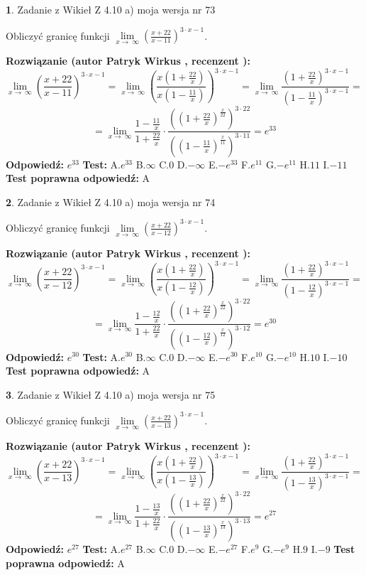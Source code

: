 \documentclass[12pt, a4paper]{article}
\theoremstyle{definition} %
\newtheorem{zad}{}
\newcommand{\zadStart}[1]{\begin{zad}#1\newline}
\newcommand{\zadStop}{\end{zad}}
\newcommand{\rozwStart}[2]{\noindent \textbf{Rozwiązanie (autor #1 , recenzent #2): }\newline}
\newcommand{\rozwStop}{\newline}
\newcommand{\odpStart}{\noindent \textbf{Odpowiedź:}\newline}
\newcommand{\odpStop}{\newline}
\newcommand{\testStart}{\noindent \textbf{Test:}\newline}
\newcommand{\testStop}{\newline}
\newcommand{\kluczStart}{\noindent \textbf{Test poprawna odpowiedź:}\newline}
\newcommand{\kluczStop}{\newline}
\begin{document}
\zadStart{Zadanie z Wikieł Z 4.10 a) moja wersja nr 73}

Obliczyć granicę funkcji  $\lim\limits_{x\to\ \infty}(\frac{x+22}{x-11})^{3\cdot x-1}$.
\zadStop
\rozwStart{Patryk Wirkus}{}
$$\lim\limits_{x\to\ \infty}(\frac{x+22}{x-11})^{3\cdot x-1} = \lim\limits_{x\to\ \infty}(\frac{x(1+\frac{22}{x})}{x(1-\frac{11}{x})})^{3\cdot x-1}=\lim\limits_{x\to\ \infty}\frac{(1+\frac{22}{x})^{3\cdot x-1}}{(1-\frac{11}{x})^{3\cdot x-1}}=$$
$$=\lim\limits_{x\to\ \infty}\frac{1-\frac{11}{x}}{1+\frac{22}{x}}\cdot\frac{((1+\frac{22}{x})^{\frac{x}{22}})^{3\cdot22}}{((1-\frac{11}{x})^{\frac{x}{11}})^{3\cdot11}}=e^{33}$$
\rozwStop
\odpStart
$e^{33}$
\odpStop
\testStart
A.$e^{33}$ B.$\infty$ C.$0$ D.$-\infty$ E.$-e^{33}$
F.$e^{11}$ G.$-e^{11}$
H.$11$
I.$-11$
\testStop
\kluczStart
A
\kluczStop



\zadStart{Zadanie z Wikieł Z 4.10 a) moja wersja nr 74}

Obliczyć granicę funkcji  $\lim\limits_{x\to\ \infty}(\frac{x+22}{x-12})^{3\cdot x-1}$.
\zadStop
\rozwStart{Patryk Wirkus}{}
$$\lim\limits_{x\to\ \infty}(\frac{x+22}{x-12})^{3\cdot x-1} = \lim\limits_{x\to\ \infty}(\frac{x(1+\frac{22}{x})}{x(1-\frac{12}{x})})^{3\cdot x-1}=\lim\limits_{x\to\ \infty}\frac{(1+\frac{22}{x})^{3\cdot x-1}}{(1-\frac{12}{x})^{3\cdot x-1}}=$$
$$=\lim\limits_{x\to\ \infty}\frac{1-\frac{12}{x}}{1+\frac{22}{x}}\cdot\frac{((1+\frac{22}{x})^{\frac{x}{22}})^{3\cdot22}}{((1-\frac{12}{x})^{\frac{x}{12}})^{3\cdot12}}=e^{30}$$
\rozwStop
\odpStart
$e^{30}$
\odpStop
\testStart
A.$e^{30}$ B.$\infty$ C.$0$ D.$-\infty$ E.$-e^{30}$
F.$e^{10}$ G.$-e^{10}$
H.$10$
I.$-10$
\testStop
\kluczStart
A
\kluczStop



\zadStart{Zadanie z Wikieł Z 4.10 a) moja wersja nr 75}

Obliczyć granicę funkcji  $\lim\limits_{x\to\ \infty}(\frac{x+22}{x-13})^{3\cdot x-1}$.
\zadStop
\rozwStart{Patryk Wirkus}{}
$$\lim\limits_{x\to\ \infty}(\frac{x+22}{x-13})^{3\cdot x-1} = \lim\limits_{x\to\ \infty}(\frac{x(1+\frac{22}{x})}{x(1-\frac{13}{x})})^{3\cdot x-1}=\lim\limits_{x\to\ \infty}\frac{(1+\frac{22}{x})^{3\cdot x-1}}{(1-\frac{13}{x})^{3\cdot x-1}}=$$
$$=\lim\limits_{x\to\ \infty}\frac{1-\frac{13}{x}}{1+\frac{22}{x}}\cdot\frac{((1+\frac{22}{x})^{\frac{x}{22}})^{3\cdot22}}{((1-\frac{13}{x})^{\frac{x}{13}})^{3\cdot13}}=e^{27}$$
\rozwStop
\odpStart
$e^{27}$
\odpStop
\testStart
A.$e^{27}$ B.$\infty$ C.$0$ D.$-\infty$ E.$-e^{27}$
F.$e^{9}$ G.$-e^{9}$
H.$9$
I.$-9$
\testStop
\kluczStart
A
\kluczStop
\end{document}
